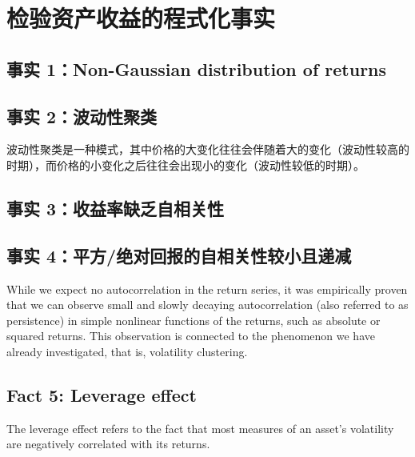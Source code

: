 \section{检验资产收益的程式化事实}
\subsection{事实 1：Non-Gaussian distribution of returns}
\subsection{事实 2：波动性聚类}
波动性聚类是一种模式，其中价格的大变化往往会伴随着大的变化（波动性较高的时期），而价格的小变化之后往往会出现小的变化（波动性较低的时期）。
\subsection{事实 3：收益率缺乏自相关性}
\subsection{事实 4：平方/绝对回报的自相关性较小且递减}
While we expect no autocorrelation in the return series, it was empirically proven that we can observe small and slowly decaying autocorrelation (also referred to as persistence) in simple nonlinear functions of the returns, such as absolute or squared returns. This observation is connected to the phenomenon we have already investigated, that is, volatility clustering.
\subsection{Fact 5: Leverage effect}
The leverage effect refers to the fact that most measures of an asset’s volatility are negatively correlated with its returns.